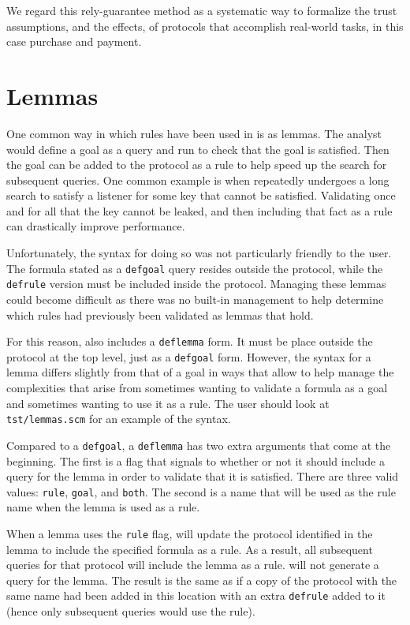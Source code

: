 We regard this rely-guarantee method as a systematic way to formalize
the trust assumptions, and the effects, of protocols that accomplish
real-world tasks, in this case purchase and payment.

\section{Lemmas}\label{sec:lemmas}
One common way in which rules have been used in {\cpsa} is as
lemmas. The analyst would define a goal as a query and run {\cpsa} to
check that the goal is satisfied. Then the goal can be added to the
protocol as a rule to help speed up the search for subsequent
queries. One common example is when {\cpsa} repeatedly undergoes a
long search to satisfy a listener for some key that cannot be
satisfied. Validating once and for all that the key cannot be leaked,
and then including that fact as a rule can drastically improve
performance. 

Unfortunately, the syntax for doing so was not particularly friendly
to the user. The formula stated as a \texttt{defgoal} query resides
outside the protocol, while the \texttt{defrule} version must be
included inside the protocol. Managing these lemmas could become
difficult as there was no built-in management to help determine which
rules had previously been validated as lemmas that hold. 

For this reason, {\cpsa} also includes a \texttt{deflemma} form. It
must be place outside the protocol at the top level, just as a
\texttt{defgoal} form. However, the syntax for a lemma differs
slightly from that of a goal in ways that allow {\cpsa} to help manage
the complexities that arise from sometimes wanting to validate a
formula as a goal and sometimes wanting to use it as a rule. The user
should look at \texttt{tst/lemmas.scm} for an example of the syntax. 

Compared to a \texttt{defgoal}, a \texttt{deflemma} has two extra
arguments that come at the beginning. The first is a flag that signals
to {\cpsa} whether or not it should include a query for the lemma in
order to validate that it is satisfied. There are three valid values:
\texttt{rule}, \texttt{goal}, and \texttt{both}. The second
is a name that will be used as the rule name when the lemma is used as
a rule.

When a lemma uses the \texttt{rule} flag, {\cpsa} will update the
protocol identified in the lemma to include the specified formula as a
rule. As a result, all subsequent queries for that protocol will
include the lemma as a rule. {\cpsa} will not generate a query for the
lemma. The result is the same as if a copy of the protocol with the
same name had been added in this location with an extra
\texttt{defrule} added to it (hence only subsequent queries would use
the rule).

